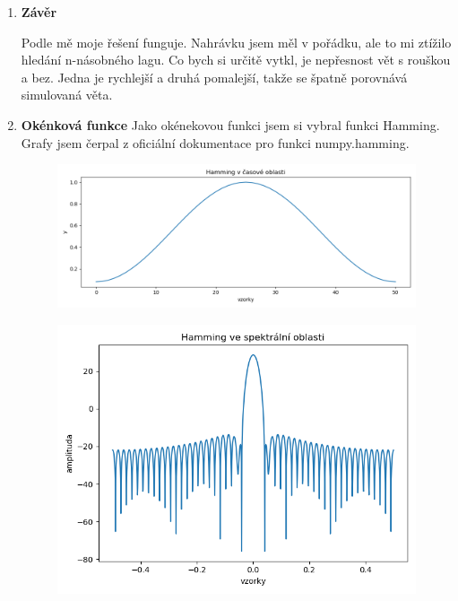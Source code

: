 \documentclass[a4paper]{article}
\begin{document}
\begin{enumerate}
	   \item \textbf{Závěr}
	   
	   \vspace{0.25cm}
	   
	   Podle mě moje řešení funguje. Nahrávku jsem měl v pořádku, ale to mi ztížilo hledání n-násobného lagu. Co bych si určitě vytkl, je nepřesnost vět s rouškou a bez. Jedna je rychlejší a druhá pomalejší, takže se špatně porovnává simulovaná věta.
	   \setcounter{enumi}{10}
	   \item \textbf{Okénková funkce}
	   \newline
	   Jako okénekovou funkci jsem si vybral funkci Hamming. Grafy jsem čerpal z oficiální dokumentace pro funkci numpy.hamming. 
	   \begin{figure}[!ht]
    	        \centering
    	        \includegraphics[scale=0.65,keepaspectratio]{fig/hamming.png}
    	        \label{fig:hamm}
	        \end{figure}
	        \begin{figure}[!ht]
    	        \centering
    	        \includegraphics[scale=0.65,keepaspectratio]{fig/hamming_DFT.png}

\end{figure}
\end{enumerate}
\end{document}
